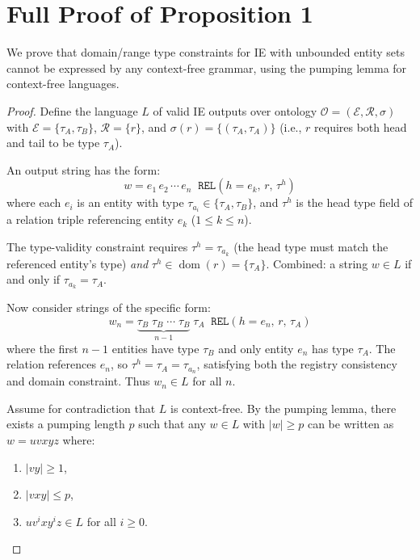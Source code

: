 
\section{Full Proof of Proposition 1}
\label{app:pumping-lemma}

We prove that domain/range type constraints for IE with unbounded entity sets cannot be expressed by any context-free grammar, using the pumping lemma for context-free languages.

\begin{proof}
Define the language $L$ of valid IE outputs over ontology $\mathcal{O} = (\mathcal{E}, \mathcal{R}, \sigma)$ with $\mathcal{E} = \{\tau_A, \tau_B\}$, $\mathcal{R} = \{r\}$, and $\sigma(r) = \{(\tau_A, \tau_A)\}$ (i.e., $r$ requires both head and tail to be type $\tau_A$).

An output string has the form:
\[
w = e_1\, e_2\, \cdots\, e_n\;\; \texttt{REL}(h{=}e_k,\, r,\, \tau^h)
\]
where each $e_i$ is an entity with type $\tau_{a_i} \in \{\tau_A, \tau_B\}$, and $\tau^h$ is the head type field of a relation triple referencing entity $e_k$ ($1 \leq k \leq n$).

The type-validity constraint requires $\tau^h = \tau_{a_k}$ (the head type must match the referenced entity's type) \emph{and} $\tau^h \in \operatorname{dom}(r) = \{\tau_A\}$.
Combined: a string $w \in L$ if and only if $\tau_{a_k} = \tau_A$.

Now consider strings of the specific form:
\[
w_n = \underbrace{\tau_B\; \tau_B\; \cdots\; \tau_B}_{n-1}\; \tau_A\;\; \texttt{REL}(h{=}e_n,\, r,\, \tau_A)
\]
where the first $n{-}1$ entities have type $\tau_B$ and only entity $e_n$ has type $\tau_A$.
The relation references $e_n$, so $\tau^h = \tau_A = \tau_{a_n}$, satisfying both the registry consistency and domain constraint.
Thus $w_n \in L$ for all $n$.

Assume for contradiction that $L$ is context-free.
By the pumping lemma, there exists a pumping length $p$ such that any $w \in L$ with $|w| \geq p$ can be written as $w = uvxyz$ where:
\begin{enumerate}[label=(\roman*)]
    \item $|vy| \geq 1$,
    \item $|vxy| \leq p$,
    \item $uv^i xy^i z \in L$ for all $i \geq 0$.
\end{enumerate}


\end{proof}
